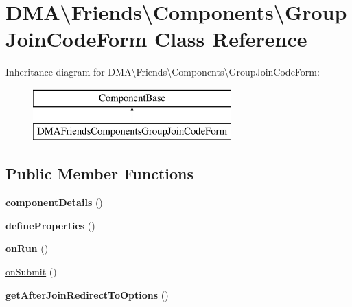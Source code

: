 \hypertarget{classDMA_1_1Friends_1_1Components_1_1GroupJoinCodeForm}{\section{D\+M\+A\textbackslash{}Friends\textbackslash{}Components\textbackslash{}Group\+Join\+Code\+Form Class Reference}
\label{classDMA_1_1Friends_1_1Components_1_1GroupJoinCodeForm}
}
Inheritance diagram for D\+M\+A\textbackslash{}Friends\textbackslash{}Components\textbackslash{}Group\+Join\+Code\+Form\+:\begin{figure}[H]
\begin{center}
\leavevmode
\includegraphics[height=2.000000cm]{d7/df7/classDMA_1_1Friends_1_1Components_1_1GroupJoinCodeForm}
\end{center}
\end{figure}
\subsection*{Public Member Functions}
\begin{DoxyCompactItemize}
\item 
\hypertarget{classDMA_1_1Friends_1_1Components_1_1GroupJoinCodeForm_aa62dbdb4806954432078c3c6635f22e5}{{\bfseries component\+Details} ()}\label{classDMA_1_1Friends_1_1Components_1_1GroupJoinCodeForm_aa62dbdb4806954432078c3c6635f22e5}

\item 
\hypertarget{classDMA_1_1Friends_1_1Components_1_1GroupJoinCodeForm_acfef6b12de7d979e4cf929d350b3a743}{{\bfseries define\+Properties} ()}\label{classDMA_1_1Friends_1_1Components_1_1GroupJoinCodeForm_acfef6b12de7d979e4cf929d350b3a743}

\item 
\hypertarget{classDMA_1_1Friends_1_1Components_1_1GroupJoinCodeForm_ad2edc54525f331f6d2005605386a7cdd}{{\bfseries on\+Run} ()}\label{classDMA_1_1Friends_1_1Components_1_1GroupJoinCodeForm_ad2edc54525f331f6d2005605386a7cdd}

\item 
\hyperlink{classDMA_1_1Friends_1_1Components_1_1GroupJoinCodeForm_a973e8781fba9d6310f07af9463fa8c58}{on\+Submit} ()
\item 
\hypertarget{classDMA_1_1Friends_1_1Components_1_1GroupJoinCodeForm_a7247cfd0d7c04daa51168c954522ef7c}{{\bfseries get\+After\+Join\+Redirect\+To\+Options} ()}\label{classDMA_1_1Friends_1_1Components_1_1GroupJoinCodeForm_a7247cfd0d7c04daa51168c954522ef7c}

\end{DoxyCompactItemize}
